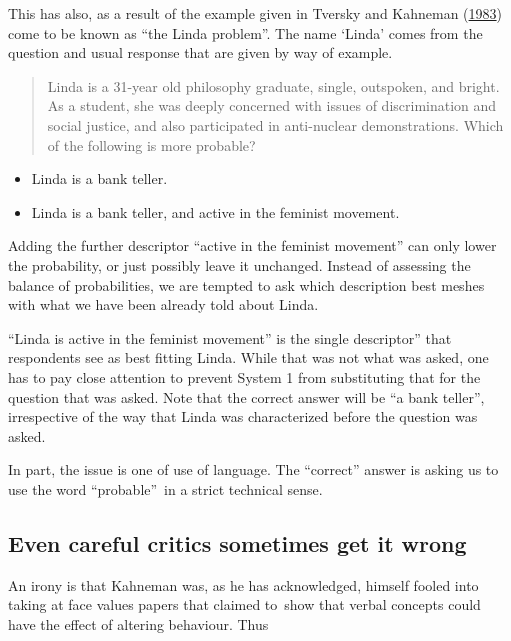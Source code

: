 \documentclass[
  10pt,
  b5paper]{book}
\providecommand{\tightlist}{%
  \setlength{\itemsep}{0pt}\setlength{\parskip}{0pt}}
\begin{document}
This has also, as a result of the example given in
Tversky and Kahneman (\protect\hyperlink{ref-tversky1983extensional}{1983}) come to be known as ``the Linda problem''.
The name `Linda' comes from the question and usual response
that are given by way of example.

\begin{quote}
Linda is a 31-year old philosophy graduate, single, outspoken, and bright. As a student, she was deeply concerned with issues of discrimination and social justice, and also participated in anti-nuclear demonstrations. Which of the following is more probable?
\end{quote}

\begin{itemize}
\tightlist
\item
  Linda is a bank teller.
\item
  Linda is a bank teller, and active in the feminist movement.
\end{itemize}

Adding the further descriptor ``active in the feminist movement'' can only lower the probability, or just possibly leave it unchanged. Instead of assessing the balance of probabilities, we are tempted to ask which description best meshes with what we have been already told about Linda.

``Linda is active in the feminist movement'' is the single descriptor'' that respondents see as best fitting Linda. While that was not what was asked, one has to pay close attention to prevent System 1 from substituting that for the question that was asked. Note that the correct answer will be ``a bank teller'', irrespective of the way that Linda was characterized before the question was asked.

In part, the issue is one of use of language. The ``correct'' answer is asking us to use the word ``probable''~in a strict technical sense.

\hypertarget{even-careful-critics-sometimes-get-it-wrong}{%
\subsection*{Even careful critics sometimes get it wrong}\label{even-careful-critics-sometimes-get-it-wrong}}

An irony is that Kahneman was, as he has acknowledged, himself fooled into taking at face values papers that claimed to~show that verbal concepts could have the effect of altering behaviour. Thus
\end{document}
